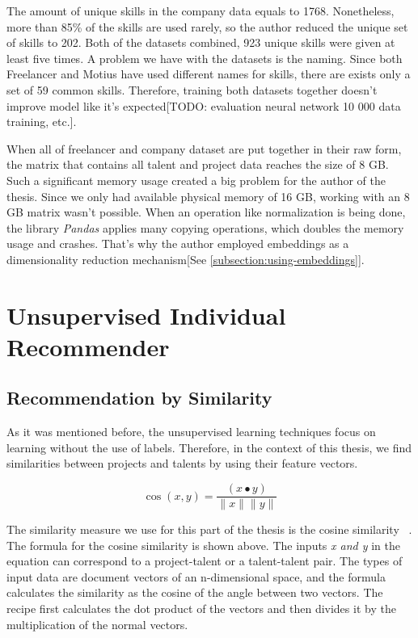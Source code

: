 The amount of unique skills in the company data equals to 1768. Nonetheless, more than 85\% of the skills are used rarely, so the author reduced the unique set of skills to  202. Both of the datasets combined, 923 unique skills were given at least five times. A problem we have with the datasets is the naming. Since both Freelancer and Motius have used different names for skills, there are exists only a set of 59 common skills. Therefore, training both datasets together doesn't improve model like it's expected[TODO: evaluation neural network 10 000 data training, etc.].



When all of freelancer and company dataset are put together in their raw form, the matrix that contains all talent and project data reaches the size of 8 GB. Such a significant memory usage created a big problem for the author of the thesis. Since we only had available physical memory of 16 GB, working with an 8 GB matrix wasn't possible. When an operation like normalization is being done, the library \textit{Pandas} applies many copying operations, which doubles the memory usage and crashes. That's why the author employed embeddings as a dimensionality reduction mechanism[See \ref{subsection:using-embeddings}].




\section{Unsupervised Individual Recommender}\label{implementation-unsupervised-individual}

\subsection{Recommendation by Similarity}\label{implementation-unsupervised-similarity}

As it was mentioned before, the unsupervised learning techniques focus on learning without the use of labels. Therefore, in the context of this thesis, we find similarities between projects and talents by using their feature vectors. 



\begin{equation}
\cos (x, y)=\frac{(x \bullet y)}{\|x\|\|y\|}
\end{equation}


The similarity measure we use for this part of the thesis is the cosine similarity ~\parencite{amatriain2011data}. The formula for the cosine similarity is shown above. The inputs  \textit{x and y} in the equation can correspond to a project-talent or a talent-talent pair. The types of input data are document vectors of an n-dimensional space, and the formula calculates the similarity as the cosine of the angle between two vectors. The recipe first calculates the dot product of the vectors and then divides it by the multiplication of the normal vectors.


